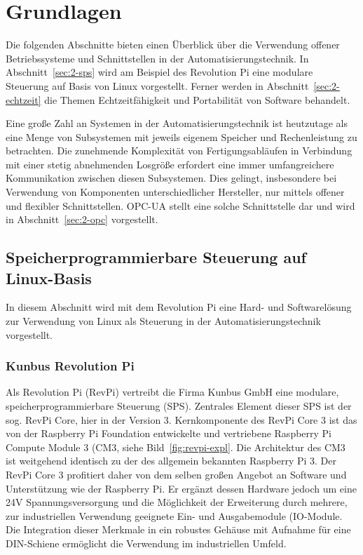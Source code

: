 % 
% 
% 
% 
% 
% 
% 

\section{Grundlagen%
  \label{sec:2-grundlagen}}
Die folgenden Abschnitte bieten einen Überblick über die Verwendung offener Betriebssysteme und
Schnittstellen in der Automatisierungstechnik.
In Abschnitt~\ref{sec:2-sps} wird am Beispiel des Revolution Pi eine modulare Steuerung 
auf Basis von Linux vorgestellt. Ferner werden in Abschnitt~\ref{sec:2-echtzeit} die Themen Echtzeitfähigkeit und Portabilität von Software behandelt.

Eine große Zahl an Systemen in der Automatisierungstechnik ist heutzutage als eine Menge von Subsystemen mit
jeweils eigenem Speicher und Rechenleistung zu betrachten. Die zunehmende Komplexität von Fertigungsabläufen in Verbindung mit einer stetig abnehmenden Losgröße erfordert eine immer umfangreichere Kommunikation zwischen diesen Subsystemen.
Dies gelingt, insbesondere bei Verwendung von Komponenten unterschiedlicher Hersteller, nur mittels offener und flexibler Schnittstellen. OPC-UA stellt eine solche Schnittstelle dar und wird in Abschnitt~\ref{sec:2-opc} vorgestellt.

\subsection{Speicherprogrammierbare Steuerung auf Linux-Basis%
     \label{sec:2-sps}}
In diesem Abschnitt wird mit dem Revolution Pi eine Hard- und Softwarelösung zur Verwendung von Linux als Steuerung in der
Automatisierungstechnik vorgestellt.

\subsubsection{Kunbus Revolution Pi%
        \label{sec:2-revpi}}
Als Revolution Pi (RevPi) vertreibt die Firma Kunbus GmbH eine modulare, speicherprogrammierbare 
Steuerung (SPS). Zentrales Element dieser SPS ist der sog. RevPi Core, hier in der Version 3.
Kernkomponente des RevPi Core 3 ist das von der Raspberry Pi Foundation entwickelte und vertriebene 
Raspberry Pi Compute Module 3 (CM3, siehe Bild~\ref{fig:revpi-expl}. 
Die Architektur des CM3 ist weitgehend identisch zu der des allgemein bekannten Raspberry Pi 3.
Der RevPi Core 3 profitiert daher von dem selben großen Angebot an Software
und Unterstützung wie der Raspberry Pi. Er ergänzt dessen Hardware jedoch um eine 24V
Spannungsversorgung und die Möglichkeit der Erweiterung durch mehrere, zur industriellen 
Verwendung geeignete Ein- und Ausgabemodule (IO-Module. Die Integration dieser Merkmale in ein robustes Gehäuse 
mit Aufnahme für eine DIN-Schiene ermöglicht die Verwendung im industriellen Umfeld.

